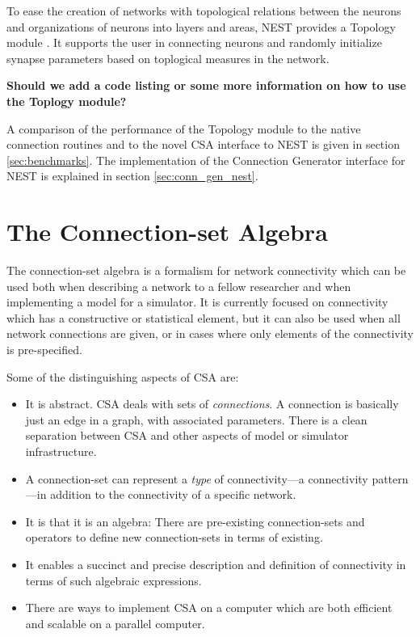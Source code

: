 \documentclass{frontiersSCNS} %
\newcommand{\tbw}[1]{{\bf\parindent0pt\color{red}#1}}
\begin{document}
To ease the creation of networks with topological relations between
the neurons and organizations of neurons into layers and areas, NEST
provides a Topology module \citep{Plesser_13}. It supports the user in
connecting neurons and randomly initialize synapse parameters based on
toplogical measures in the network.

\tbw{Should we add a code listing or some more information on how to
  use the Toplogy module?}

A comparison of the performance of the Topology module to the native
connection routines and to the novel CSA interface to NEST is given in
section \ref{sec:benchmarks}. The implementation of the Connection
Generator interface for NEST is explained in section
\ref{sec:conn_gen_nest}.


\section{The Connection-set Algebra}\label{sec:csa}

The connection-set algebra \citep[CSA;][]{djurfeldt12} is a formalism
for network connectivity which can be used both when describing a
network to a fellow researcher and when implementing a model for a
simulator.  It is currently focused on connectivity which has a
constructive or statistical element, but it can also be used when all
network connections are given, or in cases where only elements of the
connectivity is pre-specified.

Some of the distinguishing aspects of CSA are:
\begin{itemize}
\item It is abstract. CSA deals with sets of \emph{connections}. A
  connection is basically just an edge in a graph, with associated
  parameters. There is a clean separation between CSA and other
  aspects of model or simulator infrastructure.
\item A connection-set can represent a \emph{type} of
  connectivity---a connectivity pattern---in addition to the connectivity
  of a specific network.
\item It is that it is an algebra: There are pre-existing
  connection-sets and operators to define new connection-sets in terms
  of existing.
\item It enables a succinct and precise description and definition of
  connectivity in terms of such algebraic expressions.
\item There are ways to implement CSA on a computer which are both
  efficient and scalable on a parallel computer.
\end{itemize}
\end{document}
